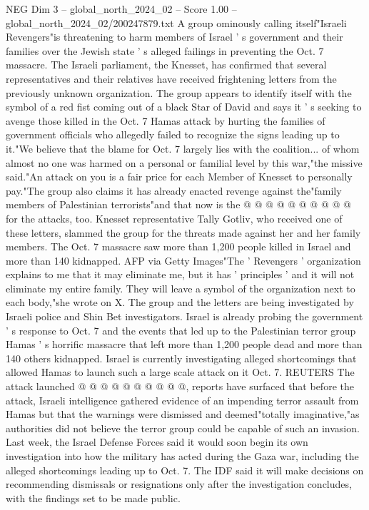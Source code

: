 \begin{textsample}{NEG Dim 3 – global\_north\_2024\_02 – Score 1.00 – global\_north\_2024\_02/200247879.txt}  \label{ex:f3_neg_208}
A group ominously calling itself"Israeli Revengers"is threatening to harm members of Israel ' s government and their families over the Jewish state ' s alleged failings in preventing the Oct. 7 massacre.
The Israeli parliament, the Knesset, has confirmed that several representatives and their relatives have received frightening letters from the previously unknown organization.
The group appears to identify itself with the symbol of a red fist coming out of a black Star of David and says it ' s seeking to avenge those killed in the Oct. 7 Hamas attack by hurting the families of government officials who allegedly failed to recognize the signs leading up to it."We believe that the blame for Oct. 7 largely lies with the coalition... of whom almost no one was harmed on a personal or familial level by this war,"the missive said."An attack on you is a fair price for each Member of Knesset to personally pay."The group also claims it has already enacted revenge against the"family members of Palestinian terrorists"and that now is the @ @ @ @ @ @ @ @ @ @ for the attacks, too.
Knesset representative Tally Gotliv, who received one of these letters, slammed the group for the threats made against her and her family members.
The Oct. 7 massacre saw more than 1,200 people killed in Israel and more than 140 kidnapped.
AFP via Getty Images"The ' Revengers ' organization explains to me that it may eliminate me, but it has ' principles ' and it will not eliminate my entire family.
They will leave a symbol of the organization next to each body,"she wrote on X.
The group and the letters are being investigated by Israeli police and Shin Bet investigators.
Israel is already probing the government ' s response to Oct. 7 and the events that led up to the Palestinian terror group Hamas ' s horrific massacre that left more than 1,200 people dead and more than 140 others kidnapped.
Israel is currently investigating alleged shortcomings that allowed Hamas to launch such a large scale attack on it Oct. 7.
REUTERS The attack launched @ @ @ @ @ @ @ @ @ @, reports have surfaced that before the attack, Israeli intelligence gathered evidence of an impending terror assault from Hamas but that the warnings were dismissed and deemed"totally imaginative,"as authorities did not believe the terror group could be capable of such an invasion.
Last week, the Israel Defense Forces said it would soon begin its own investigation into how the military has acted during the Gaza war, including the alleged shortcomings leading up to Oct. 7.
The IDF said it will make decisions on recommending dismissals or resignations only after the investigation concludes, with the findings set to be made public.

\end{textsample}
